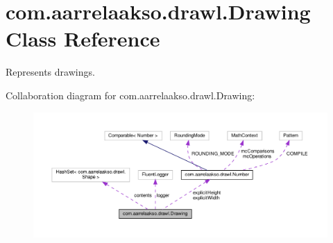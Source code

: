 \hypertarget{classcom_1_1aarrelaakso_1_1drawl_1_1_drawing}{}\section{com.\+aarrelaakso.\+drawl.\+Drawing Class Reference}
\label{classcom_1_1aarrelaakso_1_1drawl_1_1_drawing}


Represents drawings.  




Collaboration diagram for com.\+aarrelaakso.\+drawl.\+Drawing\+:
\nopagebreak
\begin{figure}[H]
\begin{center}
\leavevmode
\includegraphics[width=350pt]{dd/db2/classcom_1_1aarrelaakso_1_1drawl_1_1_drawing__coll__graph}
\end{center}
\end{figure}
